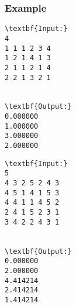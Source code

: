 \subsubsection{Example}
\begin{verbatim}
\textbf{Input:}
4
1 1 1 2 3 4
1 2 1 4 1 3
2 1 1 2 1 4
2 2 1 3 2 1


\textbf{Output:}
0.000000
1.000000
3.000000
2.000000

\end{verbatim}
\begin{verbatim}
\textbf{Input:}
5
4 3 2 5 2 4 3
4 5 1 4 1 5 3
4 4 1 1 4 5 2
2 4 1 5 2 3 1
3 4 2 2 4 3 1


\textbf{Output:}
0.000000
2.000000
4.414214
2.414214
1.414214

\end{verbatim}

\subsubsection{ }

 
